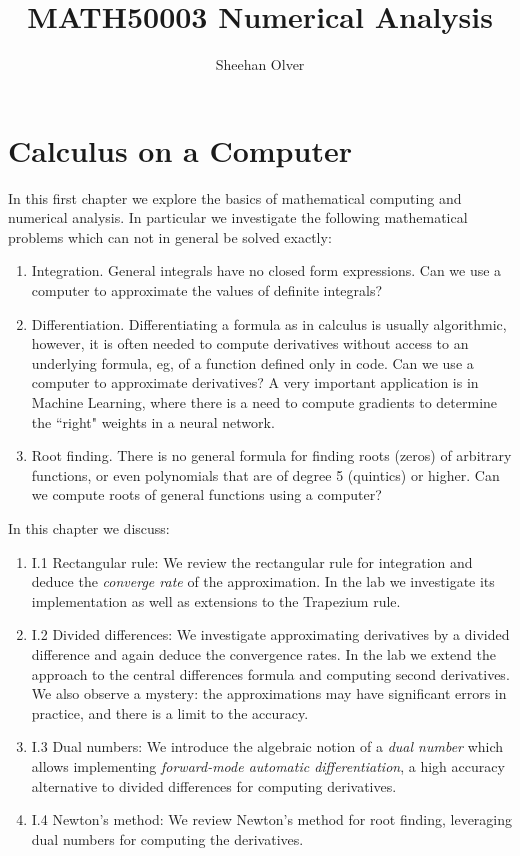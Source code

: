 \documentclass[12pt,a4paper]{book}
\title{ MATH50003 Numerical Analysis }
\author{ Sheehan Olver }
\begin{document}
\maketitle


\chapter{Calculus on a Computer}

In this first chapter we explore the basics of mathematical computing and numerical analysis.
In particular we investigate the following mathematical problems which can not in general be solved exactly:

\begin{enumerate}
\item Integration. General integrals have no closed form expressions. Can we use a computer to approximate the values of definite integrals?
\item Differentiation. Differentiating a formula as in calculus is usually algorithmic, however, it is often needed to compute derivatives without access to an underlying formula, eg, of a function defined only in code. Can we use a computer to approximate derivatives?  A very important application is in Machine Learning, where there is a need to compute gradients to determine the ``right" weights in a neural network. 
\item Root finding. There is no general formula for finding roots (zeros) of arbitrary functions, or even polynomials that are of degree 5 (quintics) or higher. Can we compute roots of general functions using a computer?
\end{enumerate}

In this chapter we discuss:

\begin{enumerate}
\item I.1 Rectangular rule: We review the rectangular rule for integration and deduce the {\it converge rate} of the approximation. In the lab  we investigate its implementation as well as extensions to the Trapezium rule. 
\item I.2 Divided differences: We investigate approximating derivatives by a divided difference and again deduce the convergence rates. In the lab we extend the approach to the central differences formula and computing second derivatives. We also observe a mystery: the approximations may have significant errors in practice, and there is a limit to the accuracy.
\item I.3 Dual numbers:  We introduce the algebraic notion of a {\it dual number} which allows implementing {\it forward-mode automatic differentiation}, a high accuracy alternative to divided differences for computing derivatives.
\item I.4 Newton's method: We review Newton's method for root finding, leveraging dual numbers for computing the derivatives.
\end{enumerate}




\end{document}
